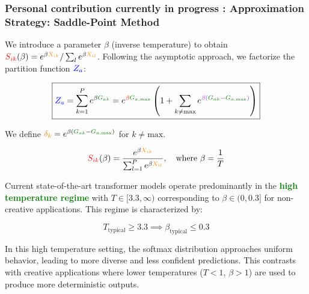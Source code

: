 \documentclass[a4paper]{article}
\theoremstyle{plain}
\theoremstyle{definition}
\theoremstyle{remark}
\begin{document}
\subsubsection{Personal contribution currently in progress : Approximation Strategy: Saddle-Point Method}

We introduce a parameter $\beta$ (inverse temperature) to obtain $\textcolor{red}{S_{ik}}(\beta) = e^{\beta \textcolor{insightcolor}{X_{ik}}} / \sum_l e^{\beta \textcolor{insightcolor}{X_{il}}}$. Following the asymptotic approach, we factorize the partition function $\textcolor{blue}{Z_a}$:

\begin{equation}
\boxed{\textcolor{blue}{Z_a} = \sum_{k=1}^{P} e^{\beta \textcolor{greencolor}{G_{ak}}} = e^{\textcolor{red}{\beta \textcolor{greencolor}{G_{a, \text{max}}}}} \left( 1 + \sum_{k \neq \text{max}} e^{\textcolor{methodcolor}{\beta (\textcolor{greencolor}{G_{ak}} - \textcolor{greencolor}{G_{a, \text{max}}})}} \right)}
\end{equation}

We define $\textcolor{orange}{\delta_k} = e^{\beta (\textcolor{greencolor}{G_{ak}} - \textcolor{greencolor}{G_{a, \text{max}}})}$ for $k \neq \text{max}$.

\begin{equation}
\textcolor{red}{S_{ik}}(\beta) = \frac{e^{\beta \textcolor{insightcolor}{X_{ik}}}}{\sum_{l=1}^{P} e^{\beta \textcolor{insightcolor}{X_{il}}}}, \quad \text{where } \beta = \frac{1}{T}
\end{equation}

\begin{tcolorbox}[colback=green!10,colframe=green!80!black,title={\textbf{High Temperature Regime in Production Models}},enhanced,drop shadow,boxrule=2pt]
Current state-of-the-art transformer models operate predominantly in the \textcolor{green}{\textbf{high temperature regime}} with $T \in [3.3, \infty)$ corresponding to $\beta \in (0, 0.3]$ for non-creative applications. This regime is characterized by:

\begin{equation}
\boxed{T_{\text{typical}} \geq 3.3 \implies \beta_{\text{typical}} \leq 0.3}
\end{equation}

In this high temperature setting, the softmax distribution approaches uniform behavior, leading to more diverse and less confident predictions. This contrasts with creative applications where lower temperatures ($T < 1$, $\beta > 1$) are used to produce more deterministic outputs.
\end{tcolorbox}
\end{document}
